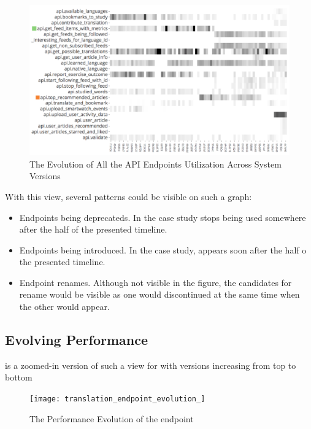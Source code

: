     \begin{figure}
      \centering
      \includegraphics[width=0.9\linewidth]{utilization-evolution}
      \caption{The Evolution of All the API Endpoints Utilization Across System Versions}
      \label{fig:mv-util}
    \end{figure}

  With this view, several patterns could be visible on such a graph:
  \begin{itemize}
    
    \item Endpoints being deprecateds. In the case study \epFeedItems stops being used somewhere after the half of the presented timeline.

    \item Endpoints being introduced. In the case study, \epTopArticles appears soon after the half o the presented timeline. 

    \item Endpoint renames. Although not visible in the figure, the candidates for rename would be visible as one would discontinued at the same time when the other would appear. 

  \end{itemize}


  \subsection*{Evolving Performance}

     is a zoomed-in version of such a view for \epTranslationsColor with versions increasing from top to bottom

    \begin{figure}[h!]
      \centering
      \texttt{[image: translation\_endpoint\_evolution\_]}
      \caption{The Performance Evolution of the \epTranslations endpoint}
      \label{fig:tee}
    \end{figure}


